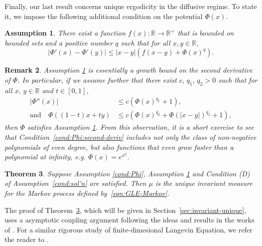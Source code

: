 \documentclass[11pt]{amsart}
\theoremstyle{definition}
\newcommand{\rbb}{\mathbb{R}}
\theoremstyle{definition}
\theoremstyle{plain}
\newtheorem{theorem}{Theorem}
\newtheorem{assumption}[theorem]{Assumption}
\newtheorem{remark}[theorem]{Remark}
\numberwithin{equation}{section}
\begin{document}
Finally, our last result concerns unique ergodicity in the diffusive regime.  To state it, we impose the following additional condition on the potential $\Phi(x)$.
\begin{assumption}\label{cond:Phi-1} There exist a function $f(x):\rbb\to\rbb^+$ that is bounded on bounded sets and a positive number $q$ such that for all $x,y\in\rbb$,
\begin{equation} \label{ineq:Phi-1}
\left| \Phi'(x)-\Phi'(y) \right|\leq  |x-y|\left(f(x-y)+\Phi(x)^q\right).
\end{equation}

\end{assumption}
\begin{remark} Assumption \ref{cond:Phi-1} is essentially a growth bound on the second derivative of $\Phi$. In particular, if we assume further that there exist $c,\, q_1,\,q_2>0$ such that for all $x,\, y\in\rbb$ and $t\in[0,1]$,
\begin{equation}\label{cond:Phi:second-deriv}
\begin{aligned} 
\left|\Phi''(x)\right|&\leq c(\Phi(x)^{q_1}+1),\\
\text{and}\quad\Phi((1-t)x+ty)&\leq c(\Phi(x)^{q_2}+\Phi(|x-y|)^{q_2}+1),
\end{aligned}
\end{equation}
then $\Phi$ satisfies Assumption \ref{cond:Phi-1}. From this observation, it is a short exercise to see that Condition~\ref{cond:Phi:second-deriv} includes not only the class of non-negative polynomials of even degree, but also functions that even grow faster than a polynomial at infinity, e.g. $\Phi(x) = e^{x^2}$. 
\end{remark}


\begin{theorem} \label{thm:inv-measure:unique} Suppose Assumption \ref{cond:Phi}, Assumption \ref{cond:Phi-1} and Condition (D) of Assumption~\ref{cond:sol'n} are satisfied. Then $\mu$ is the unique invariant measure for the Markov process defined by~\eqref{eqn:GLE-Markov}.  
\end{theorem}

The proof of Theorem~\ref{thm:inv-measure:unique}, which will be given in Section~\ref{sec:invariant-unique}, uses a asymptotic coupling argument following the ideas and results in the works of \cite{glatt2017unique, hairer2011asymptotic, kulik2015generalized}. For a similar rigorous study of finite-dimesional Langevin Equation, we refer the reader to \cite{mattingly2002ergodicity,ottobre2011asymptotic}.
\end{document}
